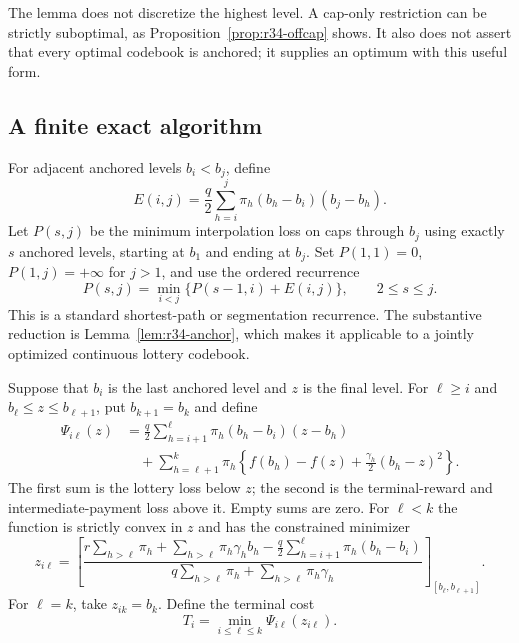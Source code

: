 The lemma does not discretize the highest level. A cap-only restriction can be strictly suboptimal, as Proposition~\ref{prop:r34-offcap} shows. It also does not assert that every optimal codebook is anchored; it supplies an optimum with this useful form.

\subsection{A finite exact algorithm}
For adjacent anchored levels $b_i<b_j$, define
\begin{equation}\label{eq:r34-edge}
 E(i,j)=\frac q2\sum_{h=i}^{j}\pi_h(b_h-b_i)(b_j-b_h).
\end{equation}
Let $P(s,j)$ be the minimum interpolation loss on caps through $b_j$ using exactly $s$ anchored levels, starting at $b_1$ and ending at $b_j$. Set $P(1,1)=0$, $P(1,j)=+\infty$ for $j>1$, and use the ordered recurrence
\begin{equation}\label{eq:r34-prefix}
 P(s,j)=\min_{i<j}\{P(s-1,i)+E(i,j)\},\qquad 2\leq s\leq j.
\end{equation}
This is a standard shortest-path or segmentation recurrence. The substantive reduction is Lemma~\ref{lem:r34-anchor}, which makes it applicable to a jointly optimized continuous lottery codebook.

Suppose that $b_i$ is the last anchored level and $z$ is the final level. For $\ell\geq i$ and $b_\ell\leq z\leq b_{\ell+1}$, put $b_{k+1}=b_k$ and define
\begin{align}
 \Psi_{i\ell}(z)
 &=\frac q2\sum_{h=i+1}^{\ell}\pi_h(b_h-b_i)(z-b_h)\nonumber\\
 &\quad+\sum_{h=\ell+1}^{k}\pi_h
 \left\{f(b_h)-f(z)+\frac{\gamma_h}{2}(b_h-z)^2\right\}.
 \label{eq:r34-tail}
\end{align}
The first sum is the lottery loss below $z$; the second is the terminal-reward and intermediate-payment loss above it. Empty sums are zero. For $\ell<k$ the function is strictly convex in $z$ and has the constrained minimizer
\begin{equation}\label{eq:r34-top}
 z_{i\ell}=\left[
 \frac{r\sum_{h>\ell}\pi_h+\sum_{h>\ell}\pi_h\gamma_hb_h
       -\frac q2\sum_{h=i+1}^{\ell}\pi_h(b_h-b_i)}
      {q\sum_{h>\ell}\pi_h+\sum_{h>\ell}\pi_h\gamma_h}
 \right]_{[b_\ell,b_{\ell+1}]}.
\end{equation}
For $\ell=k$, take $z_{ik}=b_k$. Define the terminal cost
\begin{equation}\label{eq:r34-T}
 T_i=\min_{i\leq\ell\leq k}\Psi_{i\ell}(z_{i\ell}).
\end{equation}

